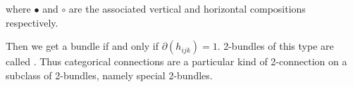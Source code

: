 where $\bullet$ and $\circ$ are the associated vertical and horizontal compositions respectively.

Then we get a bundle if and only if $\partial(h_{ijk})=1$. 2-bundles of this type are called . Thus categorical connections are a particular kind of 2-connection on a subclass of 2-bundles, namely special 2-bundles.

